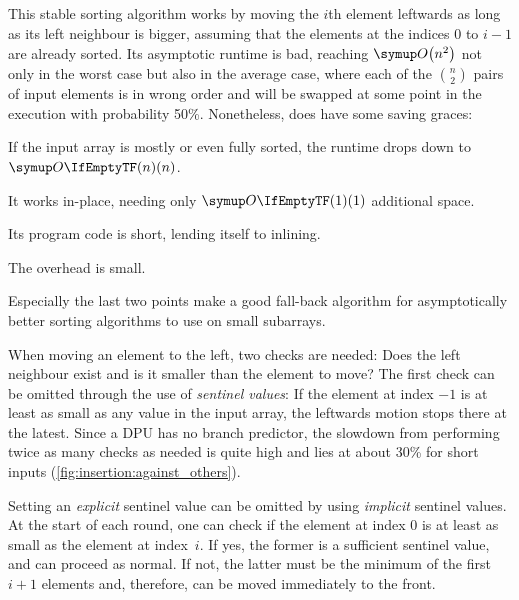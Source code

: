 \subsection{\texorpdfstring{\IS{}}{InsertionSort}}
\label{subsec:tasklet:insertion}


This stable sorting algorithm works by moving the \(i\)th element leftwards as long as its left neighbour is bigger, assuming that the elements at the indices \(0\) to \(i - 1\) are already sorted.
Its asymptotic runtime is bad, reaching \(\bigoh*{n^2}\) not only in the worst case but also in the average case, where each of the \(\binom{n}{2}\) pairs of input elements is in wrong order and will be swapped at some point in the execution with probability 50\%.
Nonetheless, \IS{} does have some saving graces:
\begin{enumerate*}
	\item
	If the input array is mostly or even fully sorted, the runtime drops down to \(\bigoh{n}\).

	\item
	It works in-place, needing only \(\bigoh{1}\) additional space.

	\item
	Its program code is short, lending itself to inlining.

	\item
	The overhead is small.
\end{enumerate*}
Especially the last two points make \IS{} a good fall-back algorithm for asymptotically better sorting algorithms to use on small subarrays.

When moving an element to the left, two checks are needed:
Does the left neighbour exist and is it smaller than the element to move?
The first check can be omitted through the use of \emph{sentinel values}:
If the element at index \(-1\) is at least as small as any value in the input array, the leftwards motion stops there at the latest.
Since a DPU has no branch predictor, the slowdown from performing twice as many checks as needed is quite high and lies at about 30\% for short inputs (\cref{fig:insertion:against_others}).

Setting an \emph{explicit} sentinel value can be omitted by using \emph{implicit} sentinel values.
At the start of each round, one can check if the element at index \(0\) is at least as small as the element at index~\(i\).
If yes, the former is a sufficient sentinel value, and \IS{} can proceed as normal.
If not, the latter must be the minimum of the first \(i + 1\) elements and, therefore, can be moved immediately to the front.


